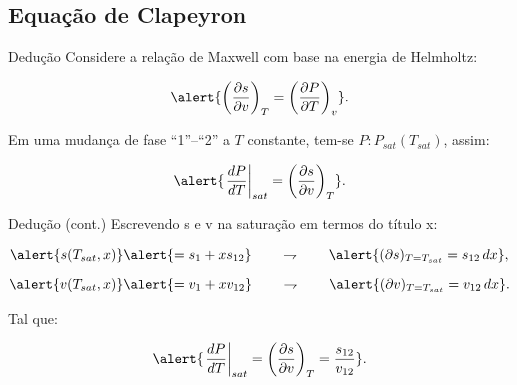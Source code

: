 \subsection{Equação de Clapeyron}

    \begin{frame}{Dedução}\vspace*{-1em}
        Considere a \alert{relação de Maxwell} com base na \alert{energia de Helmholtz}:

        \begin{equation*}
            \alert{
                \left(\frac{\partial s}{\partial v}\right)_T =
                \left(\frac{\partial P}{\partial T}\right)_v
            }.
        \end{equation*}\vspace*{\medskipamount}

        Em uma \alert{mudança de fase} ``1''--``2'' a $T$ constante, tem-se
        \alert{$P\!:\!P_{sat}(T_{sat})$}, assim:

        \begin{equation*}
            \alert{
                \left.\frac{dP}{dT}\right|_{sat} =
                \left(\frac{\partial s}{\partial v}\right)_T
            }.
        \end{equation*}
    \end{frame}

    \begin{frame}{Dedução (cont.)}\vspace*{-1em}
        Escrevendo \alert{s} e \alert{v} na saturação em termos do título \alert{x}:

        \begin{align*}
            \alert{s(T_{sat}, x)}   &\alert{= s_1 + xs_{12}}
            \qquad\rightharpoondown\qquad
            \alert{(\partial s)_{T=T_{sat}} = s_{12}\,dx},
            \\[\medskipamount]
            \alert{v(T_{sat}, x)}   &\alert{= v_1 + xv_{12}}
            \qquad\rightharpoondown\qquad
            \alert{(\partial v)_{T=T_{sat}} = v_{12}\,dx}.
        \end{align*}

        Tal que:

        \begin{equation*}
            \alert{
                \left.\frac{dP}{dT}\right|_{sat} =
                \left(\frac{\partial s}{\partial v}\right)_T =
                \frac{s_{12}}{v_{12}}
            }.
        \end{equation*}
    \end{frame}

